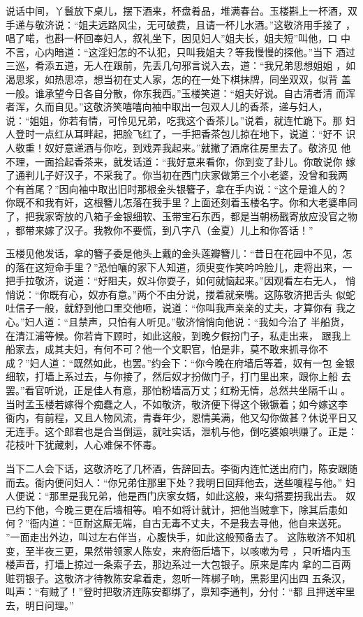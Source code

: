 说话中间，丫鬟放下桌儿，摆下酒来，杯盘肴品，堆满春台。玉楼斟上一杯酒，双
手递与敬济说：“姐夫远路风尘，无可破费，且请一杯儿水酒。”这敬济用手接了
，唱了喏，也斟一杯回奉妇人，叙礼坐下，因见妇人”姐夫长，姐夫短”叫他，口
中不言，心内暗道：“这淫妇怎的不认犯，只叫我姐夫？等我慢慢的探他。”当下
酒过三巡，肴添五道，无人在跟前，先丢几句邪言说入去，道：“我兄弟思想姐姐
，如渴思浆，如热思凉，想当初在丈人家，怎的在一处下棋抹牌，同坐双双，似背
盖一般。谁承望今日各自分散，你东我西。”玉楼笑道：“姐夫好说。自古清者清
而浑者浑，久而自见。”这敬济笑嘻嘻向袖中取出一包双人儿的香茶，递与妇人，
说：“姐姐，你若有情，可怜见兄弟，吃我这个香茶儿。”说着，就连忙跪下。那
妇人登时一点红从耳畔起，把脸飞红了，一手把香茶包儿掠在地下，说道：“好不
识人敬重！奴好意递酒与你吃，到戏弄我起来。”就撇了酒席往房里去了。敬济见
他不理，一面拾起香茶来，就发话道：“我好意来看你，你到变了卦儿。你敢说你
嫁了通判儿子好汉子，不采我了。你当初在西门庆家做第三个小老婆，没曾和我两
个有首尾？”因向袖中取出旧时那根金头银簪子，拿在手内说：“这个是谁人的？
你既不和我有奸，这根簪儿怎落在我手里？上面还刻着玉楼名字。你和大老婆串同
了，把我家寄放的八箱子金银细软、玉带宝石东西，都是当朝杨戬寄放应没官之物
，都带来嫁了汉子。我教你不要慌，到八字八（金夏）儿上和你答话！”

玉楼见他发话，拿的簪子委是他头上戴的金头莲瓣簪儿：“昔日在花园中不见，怎
的落在这短命手里？”恐怕嚷的家下人知道，须臾变作笑吟吟脸儿，走将出来，一
把手拉敬济，说道：“好阻夫，奴斗你耍子，如何就恼起来。”因观看左右无人，
悄悄说：“你既有心，奴亦有意。”两个不由分说，搂着就亲嘴。这陈敬济把舌头
似蛇吐信子一般，就舒到他口里交他咂，说道：“你叫我声亲亲的丈夫，才算你有
我之心。”妇人道：“且禁声，只怕有人听见。”敬济悄悄向他说：“我如今治了
半船货，在清江浦等候。你若肯下顾时，如此这般，到晚夕假扮门子，私走出来，
跟我上船家去，成其夫妇，有何不可？他一个文职官，怕是非，莫不敢来抓寻你不
成？”妇人道：“既然如此，也罢。”约会下：“你今晚在府墙后等着，奴有一包
金银细软，打墙上系过去，与你接了，然后奴才扮做门子，打门里出来，跟你上船
去罢。”看官听说，正是佳人有意，那怕粉墙高万丈；红粉无情，总然共坐隔千山
。当时孟玉楼若嫁得个痴蠢之人，不如敬济，敬济便下得这个锹镢着；如今嫁这李
衙内，有前程，又且人物风流，青春年少，恩情美满，他又勾你做甚？休说平日又
无连手。这个郎君也是合当倒运，就吐实话，泄机与他，倒吃婆娘哄赚了。正是：
花枝叶下犹藏刺，人心难保不怀毒。

当下二人会下话，这敬济吃了几杯酒，告辞回去。李衙内连忙送出府门，陈安跟随
而去。衙内便问妇人：“你兄弟住那里下处？我明日回拜他去，送些嗄程与他。”
妇人便说：“那里是我兄弟，他是西门庆家女婿，如此这般，来勾搭要拐我出去。
奴已约下他，今晚三更在后墙相等。咱不如将计就计，把他当贼拿下，除其后患如
何？”衙内道：“叵耐这厮无端，自古无毒不丈夫，不是我去寻他，他自来送死。
”一面走出外边，叫过左右伴当，心腹快手，如此这般预备去了。
这陈敬济不知机变，至半夜三更，果然带领家人陈安，来府衙后墙下，以咳嗽为号
，只听墙内玉楼声音，打墙上掠过一条索子去，那边系过一大包银子。原来是库内
拿的二百两赃罚银子。这敬济才待教陈安拿着走，忽听一阵梆子响，黑影里闪出四
五条汉，叫声：“有贼了！”登时把敬济连陈安都绑了，禀知李通判，分付：“都
且押送牢里去，明日问理。”

